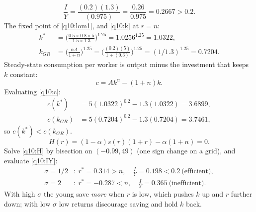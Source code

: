 \begin{sol}
\[
\frac IY=\frac{(0.2)(1.3)}{(0.975)}=\frac{0.26}{0.975}=0.2667>0.2 .
\]
The fixed point of \eqref{q10:lom1}, and \eqref{q10:k} at $r=n$:
\begin{align*}
k^\ast &= \Big(\frac{0.5\times0.8\times5}{1.5\times1.3}\Big)^{1.25}=1.0256^{1.25}=1.0322,\\
k_{GR} &= \Big(\frac{\alpha A}{1+n}\Big)^{1.25}=\Big(\frac{(0.2)(5)}{1+(0.3)}\Big)^{1.25}=(1/1.3)^{1.25}=0.7204.
\end{align*}
Steady-state consumption per worker is output minus the investment that keeps $k$ constant:
\begin{equation}
c=Ak^\alpha-(1+n)k. \label{q10:c}
\end{equation}
Evaluating \eqref{q10:c}:
\begin{align*}
c(k^\ast) &= 5(1.0322)^{0.2}-1.3(1.0322)=3.6899,\\
c(k_{GR}) &= 5(0.7204)^{0.2}-1.3(0.7204)=3.7461,
\end{align*}
so $c(k^\ast)<c(k_{GR})$.
\begin{equation}
H(r)=(1-\alpha)s(r)(1+r)-\alpha(1+n)=0. \label{q10:H}
\end{equation}
Solve \eqref{q10:H} by bisection on $(-0.99,49)$ (one sign change on a grid), and evaluate \eqref{q10:IY}:
\begin{align*}
\sigma=1/2 &: \ r^\ast=0.314>n,\quad \tfrac IY=0.198<0.2\ \text{(efficient)},\\
\sigma=2 &: \ r^\ast=-0.287<n,\quad \tfrac IY=0.365\ \text{(inefficient)}.
\end{align*}
With high $\sigma$ the young save \emph{more} when $r$ is low, which pushes $k$ up and $r$ further down; with low $\sigma$ low returns
discourage saving and hold $k$ back.
\begin{center}
\end{center}
\end{sol}
